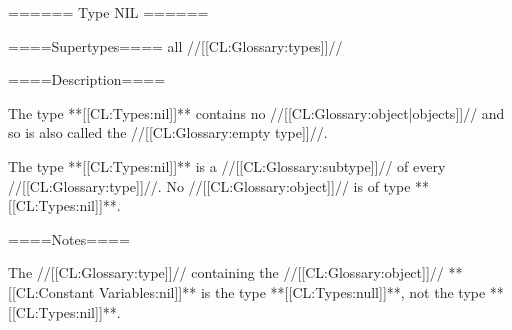 ====== Type NIL ======

====Supertypes==== all //[[CL:Glossary:types]]//

====Description====

The type **[[CL:Types:nil]]** contains no //[[CL:Glossary:object|objects]]// and so is also called the //[[CL:Glossary:empty type]]//.

The type **[[CL:Types:nil]]** is a //[[CL:Glossary:subtype]]// of every //[[CL:Glossary:type]]//. No //[[CL:Glossary:object]]// is of type **[[CL:Types:nil]]**.

====Notes====

The //[[CL:Glossary:type]]// containing the //[[CL:Glossary:object]]// **[[CL:Constant Variables:nil]]** is the type **[[CL:Types:null]]**, not the type **[[CL:Types:nil]]**.


